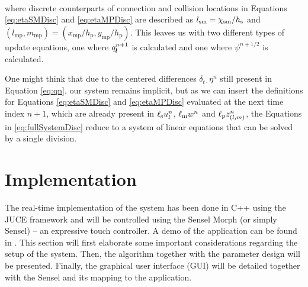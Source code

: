     \\
    where discrete counterparts of connection and collision locations in Equations \eqref{eq:etaSMDisc} and \eqref{eq:etaMPDisc} are described as $l_\text{sm} = \chi_\text{sm}/h_\text{s}$ and $(l_\text{mp}, m_\text{mp}) = (x_\text{mp}/h_\text{p}, y_\text{mp}/h_\text{p})$. This leaves us with two different types of update equations, one where $q^{n+1}_{\boldsymbol{l}}$ is calculated and one where $\psi^{n+1/2}$ is calculated.
    
    One might think that due to the centered differences $\delta_{t\cdot}\eta^n$ still present in Equation \eqref{eq:qn}, our system remains implicit, but as we can insert the definitions for Equations \eqref{eq:etaSMDisc} and \eqref{eq:etaMPDisc} evaluated at the next time index $n+1$, which are already present in $\ell_\text{s}u_l^n$, $\ell_\text{m}w^n$ and $\ell_\text{p}z_{(l,m)}^n$, the Equations in \eqref{eq:fullSystemDisc} reduce to a system of linear equations that can be solved by a single division. %
    
    \section{Implementation}\label{sec:implementation}
    The real-time implementation of the system has been done in C++ using the JUCE framework \cite{JUCE2020} and will be controlled using the Sensel Morph (or simply Sensel) -- an expressive touch controller. A demo of the application can be found in \cite{youtubeDemo:SMC2020}. This section will first elaborate some important considerations regarding the setup of the system. Then, the algorithm together with the parameter design will be presented.  Finally, the graphical user interface (GUI) will be detailed together with the Sensel and its mapping to the application.
    

